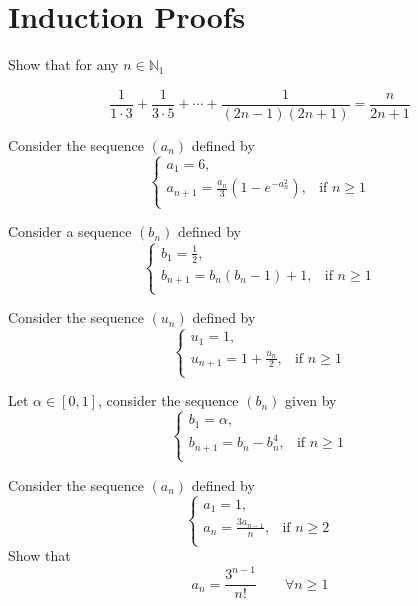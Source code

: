 \documentclass[12pt]{article}
\begin{document}
\section{Induction Proofs}
\begin{ExerciseList}
	\Exercise Show that for any \(n\in\mathbb N_1\)

	\[
		\frac{1}{1 \cdot 3} + \frac{1}{3 \cdot 5} + \cdots + \frac{1}{(2n-1)(2n+1)} = \frac{n}{2n+1}
	\]

	\Exercise
	Consider the sequence \((a_n)\) defined by
	\[
		\begin{cases}
			a_1=6, \\
			a_{n+1}  = \frac{a_n}{3}(1-e^{-a_n^2}), & \mbox{if \(n\ge 1\)} \\
		\end{cases}
	\]
	\Question{Show that \(a_n\in (0,6]\) for any \(n\in\mathbb N_1\)}

	\Exercise
	Consider a sequence \((b_n)\) defined by
	\[
		\begin{cases}
			b_1=\frac{1}{2},\\
			b_{n+1}  = b_n(b_n - 1) + 1, & \mbox{if $n\ge 1$} \\
		\end{cases}
	\]

	\Exercise
	Consider the sequence \((u_n)\) defined by
	\[
		\begin{cases}
			u_1=1,\\
			u_{n+1}  = 1 + \frac{u_n}{2}, & \mbox{if $n\ge 1$} \\
		\end{cases}
	\]

	\Exercise
	Let $\alpha\in [0,1]$, consider the sequence $(b_n)$ given by
	\[
		\begin{cases}
			b_1=\alpha,\\
			b_{n+1}  = b_n - b_n^4, & \mbox{if $n\ge 1$} \\
		\end{cases}
	\]

	\Exercise
	Consider the sequence $(a_n)$ defined by
	\[
		\begin{cases}
			a_1=1,\\
			a_{n}  = \frac{3a_{n-1}}{n}, & \mbox{if $n\ge 2$} \\
		\end{cases}
	\]
	Show that
	$$a_n=\frac{3^{n-1}}{n!}\quad\quad\forall n\ge 1$$
\end{ExerciseList}
\end{document}
